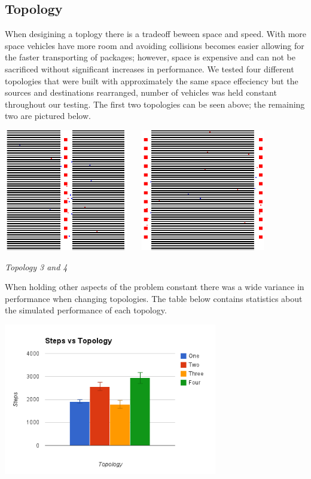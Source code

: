 \documentclass[11pt]{article}
\begin{document}
\subsection{Topology}

When desigining a toplogy there is a tradeoff beween space and speed. With more space vehicles have more room and avoiding collisions becomes easier allowing for the faster transporting of packages; however, space is expensive and can not be sacrificed without significant increases in performance. We tested four different topologies that were built with approximately the same space effeciency but the sources and destinations rearranged, number of vehicles was held constant throughout our testing. The first two topologies can be seen above; the remaining two are pictured below. 

\begin{center}
\includegraphics[height=200px]{topo_3.png} \ \ \ 
\includegraphics[height=200px]{topo_4.png}
\vspace{.1in}

\textit{Topology 3 and 4}
\end{center}

When holding other aspects of the problem constant there was a wide variance in performance when changing topologies. The table below contains statistics about the simulated performance of each topology.

\begin{center}
\includegraphics[height=250px]{topo_chart.png}
\end{center}
\end{document}
